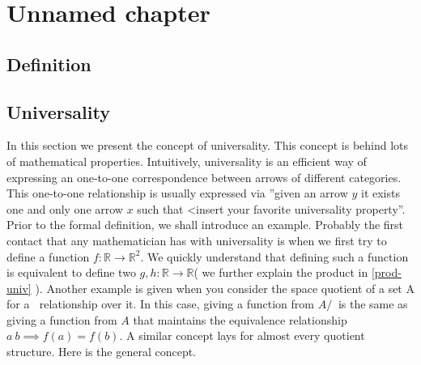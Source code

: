 
\chapter{Unnamed chapter}
\section{Definition}
\section{Universality}
In this section we present the concept of universality. This concept is behind lots of mathematical properties. Intuitively, universality is an efficient way of expressing an one-to-one correspondence between arrows of different categories. This one-to-one relationship is usually expressed via ''given an arrow  $y$ it exists one and only one  arrow $x$ such that <insert your favorite universality property''.\\

Prior to the formal definition, we shall introduce an example. Probably the first contact that any mathematician has with universality is when we first try to define a function  $f:\mathbb R \to \mathbb R^2$. We quickly understand that defining such a function is equivalent to define two $g,h: \mathbb R \to \mathbb R$( we further explain the product in \ref{prod-univ} ). Another example is given when you consider the space quotient of a set A for a $~$ relationship over it. In this case, giving a function from $A/~$ is the same as giving a function from $A$ that maintains the equivalence relationship $a~b \implies f(a)=f(b)$. A similar concept lays for almost every quotient structure. Here is the general concept.

